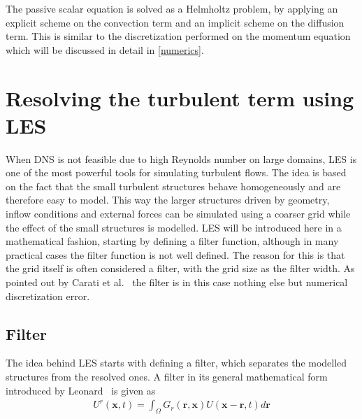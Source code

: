 The passive scalar equation is solved as a Helmholtz problem, by applying an explicit scheme on the convection term and an implicit 
scheme on the diffusion term. This is similar to the discretization performed on the momentum equation which will be discussed in 
detail in \cref{numerics}. 

\section{Resolving the turbulent term using LES} \label{LES}
When DNS is not feasible due to high Reynolds number on large domains, LES is one of the most powerful tools for simulating turbulent flows.
The idea is based on the fact that the small turbulent structures behave homogeneously and are therefore easy to model.
This way the larger structures driven by geometry, inflow conditions and external forces can be simulated using a coarser 
grid while the effect of the small structures is modelled. 
LES will be introduced here in a mathematical fashion, starting by defining a filter function,
although in many practical cases the filter function is not well defined.
The reason for this is that the grid itself is often considered a filter, with the 
grid size as the filter width. As pointed out by Carati et al.~\cite{Carati} the filter is in this case nothing else but 
numerical discretization error. 

\subsection{Filter}
The idea behind LES starts with defining a filter, which separates the modelled structures from the resolved ones. 
A filter in its general mathematical form introduced by Leonard~\cite{Leonard} is given as 
\begin{align}
    U^r(\mathbf{x},t) = \int_{\Omega} G_r(\mathbf{r},\mathbf{x})U(\mathbf{x}-\mathbf{r},t)d\mathbf{r}
    \label{eq:filter}
\end{align}


 
